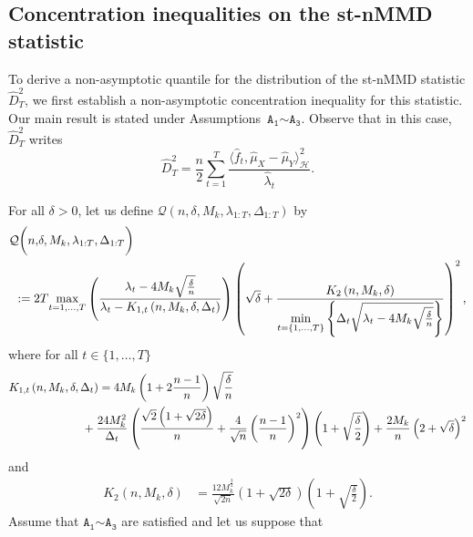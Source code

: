 \documentclass[twoside,11pt]{article}
\newcommand{\Hk}{\mathcal{H}}
\newcommand{\nb}{n}
\newcommand{\A}[1]{$\mathtt{A_#1}$}
\newcommand{\qmaj}{\mathcal{Q}}
\begin{document}
\subsection{Concentration inequalities on the st-nMMD statistic}
\label{sec:main} 
To derive a non-asymptotic quantile for the distribution of the st-nMMD statistic $\widehat{D}_T^2$, we first establish a non-asymptotic concentration inequality for this statistic. Our main result is stated under Assumptions~\A{1}$\sim$\A{3}.
 Observe that in this case, $  \widehat{D}^2_T$ writes
$$
    \widehat{D}^2_T = \frac{n}{2} \underset{t=1}{\overset{T}{\sum}} \frac{\langle \widehat{f}_t, \widehat{\mu}_X - \widehat{\mu}_Y \rangle_{\Hk}^2}{\widehat{\lambda}_t}.
$$
\begin{theorem}
    For all $\delta>0$, let us define $\qmaj\left(\nb,\delta,M_k,\lambda_{1:T},\Delta_{1:T}\right)$ by
    \begin{align}
        \qmaj \bigg(\nb,&\delta,M_k,\lambda_{1:T},\Delta_{1:T}\bigg) \notag \\
        &\hspace{-0.7cm}:= 2 T \underset{t=1,\ldots,T}{\max}  \left(\frac{\lambda_t - 4 M_k \sqrt{\frac{\delta}{\nb}}}{\lambda_t - K_{1,t}\left(\nb,M_k,\delta,\Delta_t \right) }  \right) \left(\sqrt{\delta} + \frac{K_2 \left( \nb,M_k,\delta \right)}{\underset{t=\{1,\ldots,T\}}{\min} \left\{\Delta_t \sqrt{\lambda_t - 4 M_k \sqrt{\frac{\delta}{\nb}}} \right\}} \right)^2,
        \label{x_bound}
    \end{align}
    where for all $t \in \{1,\ldots,T\}$ 
    \begin{align*}
        K_{1,t}\left(\nb,M_k,\delta,\Delta_t \right) 
         &= 4 M_k \left(1+ 2 \frac{\nb-1}{\nb} \right) \sqrt{\frac{\delta}{\nb}} \ \notag \\
        & \hspace{-0.5 cm} + \frac{24 M_k^2}{\Delta_t} \left(\frac{\sqrt{2} \left(1 +\sqrt{2\delta} \right)}{\nb } +  \frac{4}{\sqrt{\nb}} \left(\frac{\nb-1}{\nb}\right)^2 \right) \left( 1+ \sqrt{\frac{\delta}{2}} \right)  + \frac{2 M_k}{\nb} \left(2 + \sqrt{\delta} \right)^2     \end{align*}
        and
         \begin{align*}
         K_2 \left( \nb,M_k,\delta \right)  &= \frac{12 M_k^{\frac{3}{2}}}{\sqrt{2 \nb}} \left(1 + \sqrt{2\delta}\right) \left(1 + \sqrt{\frac{\delta}{2}} \right).
    \end{align*}
    Assume that \A{1}$\sim$\A{3} are satisfied and let us suppose that 
     \begin{equation}\label{A4bis}

\end{equation}
\end{theorem}
\end{document}
